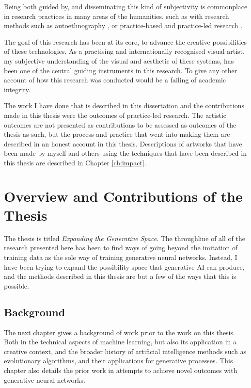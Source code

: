 Being both guided by, and disseminating this kind of subjectivity is commonplace in research practices in many areas of the humanities, such as with research methods such as autoethnography \citep{reed1997auto}, or practice-based and practice-led research \citep{candy2006practice}. 

The goal of this research has been at its core, to advance the creative possibilities of these technologies. 
As a practising and internationally recognised visual artist, my subjective understanding of the visual and aesthetic of these systems, has been one of the central guiding instruments in this research. 
To give any other account of how this research was conducted would be a failing of academic integrity. 

The work  I have done that is described in this dissertation and the contributions made in this thesis were the outcomes of practice-led research. 
The artistic outcomes are not presented as contributions to be assessed as outcomes of the thesis as such, but the process and practice that went into making them are described in an honest account in this thesis. 
Descriptions of artworks that have been made by myself and others using the techniques that have been described in this thesis are described in Chapter \ref{ch:impact}.

\section{Overview and Contributions of the Thesis}

The thesis is titled \textit{Expanding the Generative Space}. 
The throughline of all of the research presented here has been to find ways of going beyond the imitation of training data as the sole way of training generative neural networks. 
Instead, I have been trying to expand the possibility space that generative AI can produce, and the methods described in this thesis are but a few of the ways that this is possible. 

\subsection{Background}

The next chapter gives a background of work prior to the work on this thesis. 
Both in the technical aspects of machine learning, but also its application in a creative context, and the broader history of artificial intelligence methods such as evolutionary algorithms, and their applications for generative processes. 
This chapter also details the prior work in attempts to achieve novel outcomes with generative neural networks.

